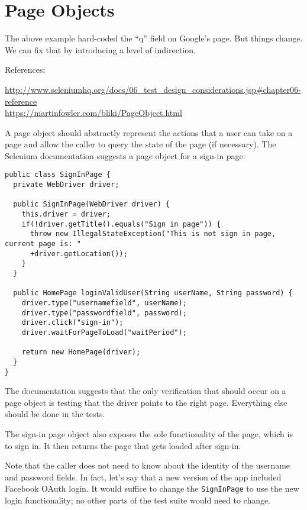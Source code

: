 \documentclass[11pt]{article}
\begin{document}
\section*{Page Objects}
The above example hard-coded the ``q'' field on Google's page.
But things change. We can fix that by introducing a level of
indirection.

References:

\url{http://www.seleniumhq.org/docs/06_test_design_considerations.jsp#chapter06-reference}\\
\url{https://martinfowler.com/bliki/PageObject.html}

A page object should abstractly represent the actions that
a user can take on a page and allow the caller to query
the state of the page (if necessary). The Selenium documentation
suggests a page object for a sign-in page:

\begin{lstlisting}
public class SignInPage {
  private WebDriver driver;

  public SignInPage(WebDriver driver) {
    this.driver = driver;
    if(!driver.getTitle().equals("Sign in page")) {
      throw new IllegalStateException("This is not sign in page, current page is: "
      +driver.getLocation());
    }
  }

  public HomePage loginValidUser(String userName, String password) {
    driver.type("usernamefield", userName);
    driver.type("passwordfield", password);
    driver.click("sign-in");
    driver.waitForPageToLoad("waitPeriod");

    return new HomePage(driver);
  }
}
\end{lstlisting}

The documentation suggests that the only verification that
should occur on a page object is testing that the driver
points to the right page. Everything else should be done in
the tests.

The sign-in page object also exposes the sole functionality of the
page, which is to sign in. It then returns the page that gets loaded
after sign-in.

Note that the caller does not need to know about the identity of the
username and password fields. In fact, let's say that a new version of
the app included Facebook OAuth login. It would suffice to change the
{\tt SignInPage} to use the new login functionality; no other parts of the test suite would need to change.
\end{document}

